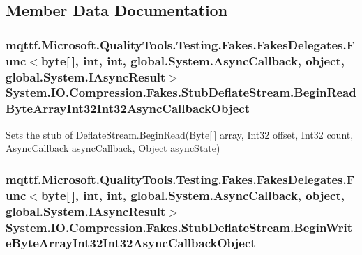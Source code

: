 \subsection{Member Data Documentation}
\hypertarget{class_system_1_1_i_o_1_1_compression_1_1_fakes_1_1_stub_deflate_stream_a3394981c5e7bbae9929f5d3a62eb335c}{
\subsubsection[{Begin\-Read\-Byte\-Array\-Int32\-Int32\-Async\-Callback\-Object}]{\setlength{\rightskip}{0pt plus 5cm}mqttf.\-Microsoft.\-Quality\-Tools.\-Testing.\-Fakes.\-Fakes\-Delegates.\-Func$<$byte\mbox{[}$\,$\mbox{]}, int, int, global.\-System.\-Async\-Callback, object, global.\-System.\-I\-Async\-Result$>$ System.\-I\-O.\-Compression.\-Fakes.\-Stub\-Deflate\-Stream.\-Begin\-Read\-Byte\-Array\-Int32\-Int32\-Async\-Callback\-Object}}\label{class_system_1_1_i_o_1_1_compression_1_1_fakes_1_1_stub_deflate_stream_a3394981c5e7bbae9929f5d3a62eb335c}


Sets the stub of Deflate\-Stream.\-Begin\-Read(\-Byte\mbox{[}$\,$\mbox{]} array, Int32 offset, Int32 count, Async\-Callback async\-Callback, Object async\-State)

\hypertarget{class_system_1_1_i_o_1_1_compression_1_1_fakes_1_1_stub_deflate_stream_a3cfd6975d2b4400fabbf25133f2c56cf}{
\subsubsection[{Begin\-Write\-Byte\-Array\-Int32\-Int32\-Async\-Callback\-Object}]{\setlength{\rightskip}{0pt plus 5cm}mqttf.\-Microsoft.\-Quality\-Tools.\-Testing.\-Fakes.\-Fakes\-Delegates.\-Func$<$byte\mbox{[}$\,$\mbox{]}, int, int, global.\-System.\-Async\-Callback, object, global.\-System.\-I\-Async\-Result$>$ System.\-I\-O.\-Compression.\-Fakes.\-Stub\-Deflate\-Stream.\-Begin\-Write\-Byte\-Array\-Int32\-Int32\-Async\-Callback\-Object}}\label{class_system_1_1_i_o_1_1_compression_1_1_fakes_1_1_stub_deflate_stream_a3cfd6975d2b4400fabbf25133f2c56cf}


